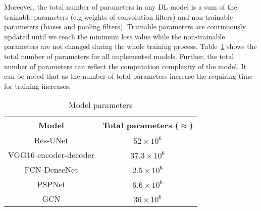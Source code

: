 \clearpage
Moreover, the total number of parameters in any DL model is a sum of the trainable parameters (e.g weights of convolution filters) and non-trainable parameters (biases and pooling filters).
Trainable parameters are continuously updated until we reach the minimum loss value while the non-trainable parameters are not changed during the whole training process.
Table~\ref{tab:table_parameters} shows the total number of parameters for all implemented models.
Further, the total number of parameters can reflect the computation complexity of the model.
It can be noted that as the number of total parameters increase the requiring time for training increases.
\begin{table}[]
	\centering
	\caption{Model parameters}
	\label{tab:table_parameters}
		\begin{tabular}{cc}\hline
			Model &  Total parameters (\(\approx\)) \\ \hline
			Res-UNet & \(52\times 10^6\) \\ 
			VGG16 encoder-decoder & \(37.3\times 10^6\)  \\
			FCN-DenseNet & \(2.5\times 10^6\) \\ 
			PSPNet & \(6.6\times 10^6\) \\ 
			GCN & \(36\times 10^6\) \\ \hline
		\end{tabular}
\end{table}
